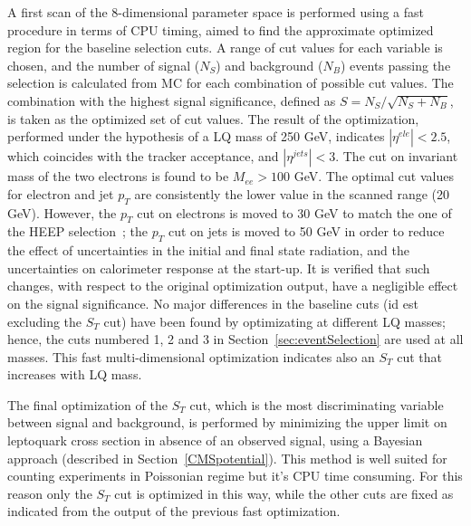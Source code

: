 A first scan of the 8-dimensional parameter space is performed using a fast procedure in terms of CPU timing, 
aimed to find the approximate optimized region for the baseline selection cuts.
A range of cut values for each variable is chosen, and the number of signal ($N_S$) 
and background ($N_B$) events passing the selection is calculated from MC for each combination 
of possible cut values. The combination with the highest signal significance, 
defined as $S = N_S/\sqrt{N_S+N_B}$, is taken as the optimized set of cut values. %
The result of the optimization, performed under the hypothesis of a LQ mass of 250 GeV, 
indicates $|\eta^{ele}|<2.5$, which coincides with the tracker acceptance,
and $|\eta^{jets}|<3$. The cut on invariant mass of the two electrons is found to be $M_{ee}>100$ GeV. The 
optimal cut values for electron and jet $p_T$ are consistently the lower value in the scanned range 
(20 GeV). However, the $p_{T}$ cut on electrons is moved to 30 GeV to match the one of the HEEP 
selection~\cite{HEEPNOTE}; %
the $p_{T}$ cut on jets is moved to 50 GeV in order to reduce the effect 
of uncertainties in the initial and final state radiation, and the uncertainties 
on calorimeter response at the start-up. It is verified that such changes, with respect to the original 
optimization output, have a negligible effect on the signal significance. 
No major differences in the baseline cuts (id est excluding the $S_T$ cut) have been found by optimizating 
at different LQ masses; hence, the cuts numbered 1, 2 and 3 in Section~\ref{sec:eventSelection} 
are used at all masses.
This fast multi-dimensional optimization indicates also an $S_T$ cut that increases with LQ mass. 

The final optimization of the $S_T$ cut, which is the most discriminating variable between signal and background, 
is performed by minimizing the upper limit on leptoquark cross section in absence of an observed signal, 
using a Bayesian approach (described in Section~\ref{CMSpotential}). 
This method is well suited for counting experiments in Poissonian regime but it's CPU time consuming. 
For this reason only the $S_T$ cut is optimized in this way, while the other cuts are fixed as indicated from 
the output of the previous fast optimization.

